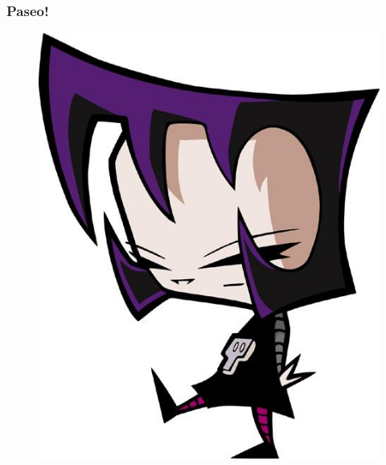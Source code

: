 \begin{frame}
\frametitle{Paseo!}
      \begin{figure}[ht]
        \centering
        \includegraphics[scale=0.4]{imgs/gaz}
      \end{figure}
\end{frame}




